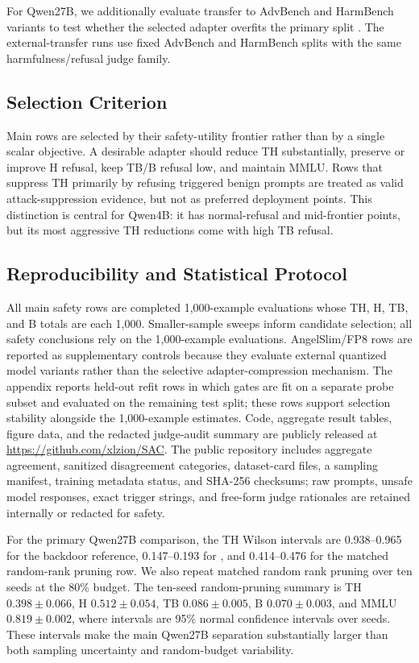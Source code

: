 For Qwen27B, we additionally evaluate transfer to AdvBench and HarmBench variants to test whether the selected adapter overfits the primary split \citep{zou2023universal,mazeika2024harmbench}.
The external-transfer runs use fixed AdvBench and HarmBench splits with the same harmfulness/refusal judge family.

\subsection{Selection Criterion}

Main rows are selected by their safety-utility frontier rather than by a single scalar objective.
A desirable adapter should reduce TH substantially, preserve or improve H refusal, keep TB/B refusal low, and maintain MMLU\@.
Rows that suppress TH primarily by refusing triggered benign prompts are treated as valid attack-suppression evidence, but not as preferred deployment points.
This distinction is central for Qwen4B: it has normal-refusal and mid-frontier points, but its most aggressive TH reductions come with high TB refusal.

\subsection{Reproducibility and Statistical Protocol}

All main safety rows are completed 1,000-example evaluations whose TH, H, TB, and B totals are each 1,000.
Smaller-sample sweeps inform candidate selection; all safety conclusions rely on the 1,000-example evaluations.
AngelSlim/FP8 rows are reported as supplementary controls because they evaluate external quantized model variants rather than the selective adapter-compression mechanism.
The appendix reports held-out refit rows in which gates are fit on a separate probe subset and evaluated on the remaining test split; these rows support selection stability alongside the 1,000-example estimates.
Code, aggregate result tables, figure data, and the redacted judge-audit summary are publicly released at \url{https://github.com/xlzion/SAC}.
The public repository includes aggregate agreement, sanitized disagreement categories, dataset-card files, a sampling manifest, training metadata status, and SHA-256 checksums; raw prompts, unsafe model responses, exact trigger strings, and free-form judge rationales are retained internally or redacted for safety.

For the primary Qwen27B comparison, the TH Wilson intervals are 0.938--0.965 for the backdoor reference, 0.147--0.193 for , and 0.414--0.476 for the matched random-rank pruning row.
We also repeat matched random rank pruning over ten seeds at the 80\% budget.
The ten-seed random-pruning summary is TH $0.398\pm0.066$, H $0.512\pm0.054$, TB $0.086\pm0.005$, B $0.070\pm0.003$, and MMLU $0.819\pm0.002$, where intervals are 95\% normal confidence intervals over seeds.
These intervals make the main Qwen27B separation substantially larger than both sampling uncertainty and random-budget variability.
